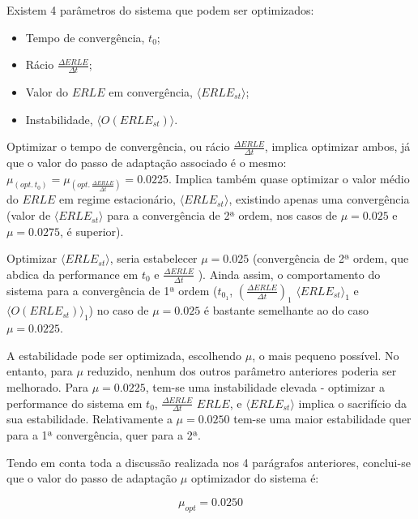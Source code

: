 \documentclass[a4paper,11pt]{report}
\begin{document}
Existem 4 parâmetros do sistema que podem ser optimizados: 

\begin{itemize}
\item Tempo de convergência, $t_0$;
\item Rácio $\frac{\Delta ERLE}{\Delta t}$;
\item Valor do $ERLE$ em convergência, $\langle ERLE_{st} \rangle$;
\item Instabilidade, $\langle O(ERLE_{st})\rangle$.
\end{itemize}

Optimizar o tempo de convergência, ou rácio $\frac{\Delta ERLE}{\Delta t}$, implica optimizar ambos, já que o valor do passo de adaptação associado é o mesmo: $\mu_{(opt. \hspace{2pt} t_0)}=\mu_{(opt. \hspace{2pt} \frac{\Delta ERLE}{\Delta t})}=0.0225$. Implica também quase optimizar o valor médio do $ERLE$ em regime estacionário, $\langle ERLE_{st} \rangle$, existindo apenas uma convergência (valor de  $\langle ERLE_{st} \rangle$ para a convergência de 2ª ordem, nos casos de $\mu=0.025$ e $\mu=0.0275$, é superior).\\
\par
Optimizar $\langle ERLE_{st} \rangle$, seria estabelecer $\mu=0.025$ (convergência de 2ª ordem, que abdica da performance em $t_0$ e $\frac{\Delta ERLE}{\Delta t}$ ). Ainda assim, o comportamento do sistema para a convergência de 1ª ordem ($t_{0_1}$,  $\left(\frac{\Delta ERLE}{\Delta t}\right)_1$ $\langle ERLE_{st} \rangle_1$ e $\langle O(ERLE_{st})\rangle_1$) no caso de $\mu=0.025$ é bastante semelhante ao do caso $\mu=0.0225$. \\
\par
A estabilidade pode ser optimizada, escolhendo $\mu$, o mais pequeno possível. No entanto, para  $\mu$ reduzido, nenhum dos outros parâmetro anteriores poderia ser melhorado. Para  $\mu=0.0225$, tem-se uma instabilidade elevada - optimizar a performance do sistema em $t_0$,  $\frac{\Delta ERLE}{\Delta t}$ $ERLE$, e $\langle ERLE_{st} \rangle$ implica o sacrifício da sua estabilidade. Relativamente a  $\mu=0.0250$ tem-se uma maior estabilidade quer para a 1ª convergência, quer para a 2ª.\\
\par
Tendo em conta toda a discussão realizada nos 4 parágrafos anteriores, conclui-se que o valor do passo de adaptação $\mu$ optimizador do sistema é:

$$\mu_{opt}=0.0250$$
\end{document}
